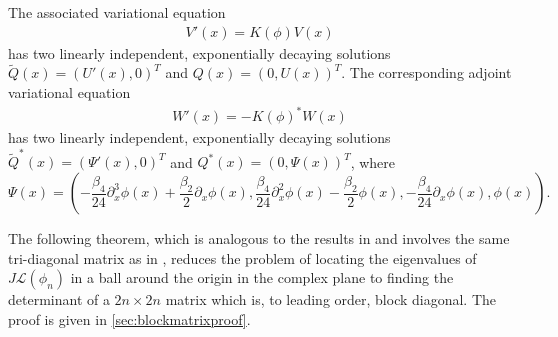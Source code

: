 \documentclass[12pt]{elsarticle}
\def\calL{{\mathcal L}}
\begin{document}
The associated variational equation 
\begin{align}
V'(x) = K(\phi)V(x) \label{vareq}
\end{align}
has two linearly independent, exponentially decaying solutions $\tilde{Q}(x) = (U'(x), 0)^T$ and $Q(x) = (0, U(x))^T$. The corresponding adjoint variational equation
\begin{align}
W'(x) = -K(\phi)^*W(x)\label{adjvareq}
\end{align}
has two linearly independent, exponentially decaying solutions $\tilde{Q}^*(x) = (\Psi'(x), 0)^T$ and $Q^*(x) = (0, \Psi(x) )^T$, where
\begin{equation}\label{defPsi}
\Psi(x) =
\left( -\frac{\beta_4}{24} \partial_x^3 \phi(x) + \frac{\beta_2}{2} \partial_x \phi(x),
\frac{\beta_4}{24} \partial_x^2 \phi(x) - \frac{\beta_2}{2} \phi(x),
- \frac{\beta_4}{24} \partial_x \phi(x), \phi(x) \right).
\end{equation}

The following theorem, which is analogous to the results in \cite[Section 3.4]{Manukian} and involves the same tri-diagonal matrix as in \cite[Theorem 2]{Sandstede1998}, reduces the problem of locating the eigenvalues of $J \calL(\phi_n)$ in a ball around the origin in the complex plane to finding the determinant of a $2n\times 2n$ matrix which is, to leading order, block diagonal. The proof is given in \cref{sec:blockmatrixproof}.
\end{document}
